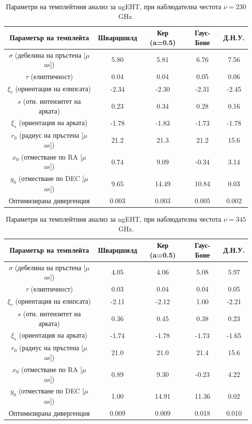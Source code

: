\newpage

\begin{table}[h!]
	\centering
	\begin{tabular}{c|c|c|c|c}
		\hline
		{Параметър на темплейта} & {Шварцшилд}&{Кер (a=0.5)}&{Гаус-Боне}&{Д.Н.У.}
		\\\hline\hline
		$\sigma$ {(дебелина на пръстена [$\mu$as])} & 5.80&5.81&6.76&7.56
		\\
		$\tau$ {(елиптичност)} & 0.04&0.04&0.05&0.06
		\\
		$\xi_\tau$ {(ориентация на елипсата)} & -2.34&-2.30&-2.31&-2.45
		\\
		$s$ {(отн. интензитет на арката)} & 0.23&0.34&0.28&0.16
		\\
		$\xi_s$ {(ориентация на арката)} & -1.78&-1.83&-1.73&-1.78
		\\\hline
		$r_0$ {(радиус на пръстена [$\mu$as])} & 21.2&21.3&21.2&15.6
		\\
		$x_0$ {(отместване по RA [$\mu$as])} & 0.74&9.09&-0.34&3.14
		\\
		$y_0$ {(отместване по DEC [$\mu$as])} & 9.65& 14.49&10.84&0.03
		\\\hline\hline
		{Оптимизирана дивергенция} & 0.003&0.003&0.005&0.002
		\\ \hline
	\end{tabular}
	\caption[Параметри на темплейтния анализ за ngEHT, при наблюдателна честота $\nu = 230$ GHz.]{\small Параметри на темплейтния анализ за ngEHT, при наблюдателна честота $\nu = 230$ GHz.}
	\label{table:VIDA_ngEHT}
\end{table}

\begin{table}[h!]
	\centering
	\begin{tabular}{c|c|c|c|c}
		\hline
		{Параметър на темплейта} & {Шварцшилд}&{Кер (a=0.5)}&{Гаус-Боне}&{Д.Н.У.}
		\\\hline\hline
		$\sigma$ {(дебелина на пръстена [$\mu$as])} & 4.05&4.06&5.08&5.97
		\\
		$\tau$ {(елиптичност)} & 0.03&0.04&0.04&0.05
		\\
		$\xi_\tau$ {(ориентация на елипсата)} & -2.11&-2.12&1.00&-2.21
		\\
		$s$ {(отн. интензитет на арката)} & 0.36&0.45&0.38&0.23
		\\
		$\xi_s$ {(ориентация на арката)} & -1.74&-1.78&-1.73&-1.65
		\\\hline
		$r_0$ {(радиус на пръстена [$\mu$as])} & 21.0&21.0&21.4&15.6
		\\
		$x_0$ {(отместване по RA [$\mu$as])} & 0.89&9.30&-0.23&4.22
		\\
		$y_0$ {(отместване по DEC [$\mu$as])} & 1.00& 14.91&11.36&0.02
		\\\hline\hline
		{Оптимизирана дивергенция} & 0.009&0.009&0.018&0.010
		\\ \hline
	\end{tabular}
	\caption[Параметри на темплейтния анализ за ngEHT, при наблюдателна честота $\nu = 345$ GHz.]{\small Параметри на темплейтния анализ за ngEHT, при наблюдателна честота $\nu = 345$ GHz.}
	\label{table:VIDA_ngEHT_1}
\end{table}

